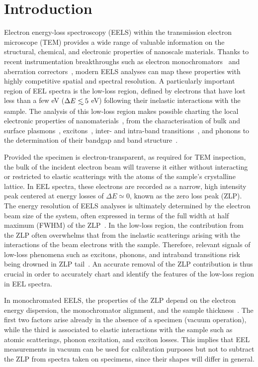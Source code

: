 \section{Introduction}
\label{sec:introduction}

Electron energy-loss spectroscopy (EELS) within the transmission electron microscope (TEM) provides
a wide range of
valuable information on the structural, chemical, and electronic properties of nanoscale materials.
%
Thanks to recent instrumentation breakthroughs
such as electron monochromators~\cite{Terauchi:2005, Freitag:2005} and aberration correctors~\cite{Haider:1998},
modern EELS analyses can map these properties with highly competitive spatial and spectral resolution.
%
A particularly important region of EEL spectra is
the low-loss region, defined by electrons that have lost
less than a few eV ($\Delta E\lsim 5$ eV) following their inelastic interactions
with the sample.
%
The analysis of this low-loss region makes possible charting the local
electronic properties of nanomaterials~\cite{Geiger:1967}, from the characterisation of
bulk and surface plasmons~\cite{Schaffer:2008}, excitons~\cite{Erni:2005}, 
inter- and intra-band transitions~\cite{Rafferty:1998},
and phonons to the determination of their bandgap and band structure~\cite{Stoger:2008}.


Provided the specimen is electron-transparent, as required for TEM inspection,
the bulk of the incident electron beam will traverse it
either without interacting or restricted to elastic scatterings with the atoms
of the sample's crystalline lattice.
%
In EEL spectra, these electrons are recorded as a narrow,
high intensity peak centered at energy losses
of $\Delta E\simeq 0$, known as the zero loss peak (ZLP).
%
The energy resolution of EELS analyses is ultimately determined by
the electron beam size of the system, often expressed in terms
of the full width at half maximum (FWHM) of the
ZLP~\cite{Egerton:2009}.
%
In the low-loss region, the contribution from the ZLP
often overwhelms that from the inelastic scatterings arising with
the interactions of the beam electrons
with the sample.
%
Therefore, relevant signals of low-loss phenomena such as excitons,
phonons, and intraband transitions risk being drowned
in ZLP tail~\cite{Abajo:2010}.
%
An accurate removal of the ZLP
contribution is thus crucial in order to accurately chart and identify the features
of the low-loss region in EEL spectra. 

In monochromated EELS, the properties of the ZLP depend on the electron energy dispersion,
the monochromator alignment, and the sample thickness~\cite{Park:2008, Stoger:2008}.
%
The first two factors arise already in the absence of a specimen (vacuum operation),
while the third is associated
to elastic interactions with the sample such as atomic scatterings,
phonon excitation, and exciton losses.
%
This implies that EEL measurements in vacuum can be used for calibration purposes
but not to subtract the ZLP from spectra taken on specimens, since their shapes will differ
in general.



